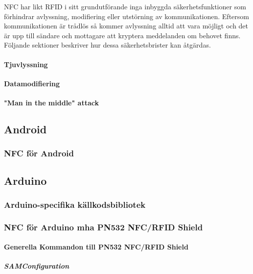 \documentclass[11pt]{article}
\begin{document}
NFC har likt RFID i sitt grundutförande inga inbyggda säkerhetsfunktioner som förhindrar avlyssning, modifiering eller utstörning av kommunikationen. Eftersom kommunikationen är trådlös så kommer avlyssning alltid att vara möjligt och det är upp till sändare och mottagare att kryptera meddelanden om behovet finns. Följande sektioner beskriver hur dessa säkerhetsbrister kan åtgärdas. 

\paragraph{Tjuvlyssning}

\paragraph{Datamodifiering}

\paragraph{"Man in the middle" attack}


\subsection{Android}

\subsubsection{NFC för Android}

\subsection{Arduino}

\subsubsection{Arduino-specifika källkodsbibliotek}

\subsubsection{NFC för Arduino mha PN532 NFC/RFID Shield}

\paragraph{Generella Kommandon till PN532 NFC/RFID Shield}

\subparagraph{SAMConfiguration}
\end{document}
